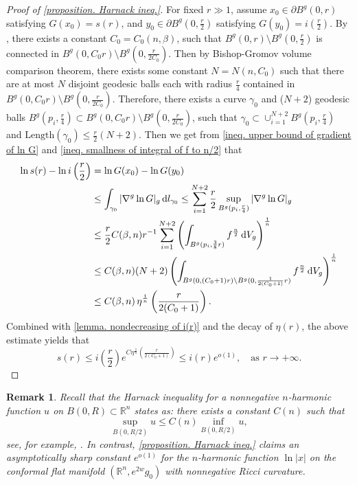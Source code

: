 \documentclass[10pt,a4paper]{amsart}
\newtheorem{remark}[theorem]{Remark}
\numberwithin{equation}{section}
\newcommand{\dd}{\mathop{}\!\mathrm{d}}%
\begin{document}
\begin{proof}[Proof of \cref{proposition. Harnack ineq.}]
    For fixed $r\gg 1$, assume $x_0\in \partial B^g(0,r)$ satisfying $G(x_0)=s(r)$, and $y_0\in \partial B^g(0,\frac{r}{2})$ satisfying $G(y_0)=i(\frac{r}{2})$.
 By \cite[Proposition 4.5]{HK}, there exists a constant $C_0=C_0(n,\beta)$, such that $B^g(0,r)\setminus B^g(0,\frac{r}{2})$ is connected in $B^g(0,C_0r)\setminus B^g(0,\frac{r}{2C_0})$. Then by Bishop-Gromov volume comparison theorem, there exists some constant $N=N(n,C_0)$ such that there are at most $N$ disjoint geodesic balls each with radius $\frac{r}{4}$ contained in $B^g(0,C_0r)\setminus B^g(0,\frac{r}{2C_0})$. Therefore, there exists a curve $\gamma_0$ and  ($N+2$) geodesic balls $B^g(p_i,\frac{r}{4})
    \subset B^g(0,C_0r)\setminus B^g(0,\frac{r}{2C_0})$, such that $\gamma_0\subset \cup_{i=1}^{N+2}B^g(p_i,\frac{r}{4})$ and $\mathrm{Length}(\gamma_0)\leq \frac{r}{2}(N+2)$.
    Then we get from \cref{ineq. upper bound of gradient of ln G} and  \cref{ineq. smallness of integral of f to n/2} that
    \begin{align*}
        \ln s(r)-\ln i\left(\frac{r}{2}\right)
        &=\ln G(x_0)-\ln G(y_0) \\ \notag
        &\leq \int_{\gamma_0}|\nabla^g\ln G|_g\dd l_{\gamma_0}                \leq \sum_{i=1}^{N+2}\frac{r}{2}\sup_{B^g(p_i,\frac{r}{4})}|\nabla^g \ln G|_g\\
        &\leq \frac{r}{2}C(\beta,n)r^{-1}\sum_{i=1}^{N+2}
    \left(\int_{B^g(p_i,\frac{3}{8}r)} f^{\frac{n}{2}}\dd V_g \right)^{\frac{1}{n}}\\
    &\leq C(\beta,n)(N+2)
    \left(\int_{B^g(0,(C_0+1)r)\setminus B^g(0,\frac{1}{2(C_0+1)}r)} f^{\frac{n}{2}} \dd V_g \right)^{\frac{1}{n}}\\
    &\leq C(\beta,n)\, \eta^{\frac{1}{n}}\left(\frac{r}{2(C_0+1)}\right).
    \end{align*}
    Combined with \cref{lemma. nondecreasing of i(r)} and the decay of $\eta(r)$, the above estimate yields that
    \[
        s(r)\leq i\left(\frac{r}{2}\right)e^{C\eta^{\frac{1}{n}}
        \left(\frac{r}{2(C_0+1)}\right)}
        \leq i(r)e^{o(1)},\quad \text{as } r\to +\infty.
    \]
\end{proof}
\begin{remark}
    Recall that the Harnack inequality for a nonnegative $n$-harmonic function $u$ on $B(0,R)\subset\mathbb{R}^n$ states as: there exists a constant $C(n)$ such that
    \[
        \sup_{B(0,R/2)}u\leq C(n)\inf_{B(0,R/2)}u,
    \]
    see, for example, \cite[Theorem 2.20]{Lin}.
    In contrast, \cref{proposition. Harnack ineq.} claims an asymptotically sharp constant $e^{o(1)}$ for the $n$-harmonic function $\ln |x|$ on the conformal flat manifold $(\mathbb{R}^n,e^{2w}g_0)$ with nonnegative Ricci curvature.
\end{remark}
\end{document}

